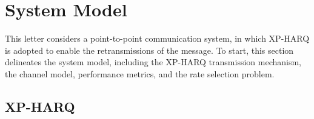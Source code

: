 \documentclass[lettersize,journal]{IEEEtran}
\begin{document}
\section{System Model}\label{sec:sys mod}
This letter considers a point-to-point communication system, in which XP-HARQ is adopted to enable the retransmissions of the message. To start, this section delineates the system model, including the XP-HARQ transmission mechanism, the channel model, performance metrics, and the rate selection problem.

\subsection{XP-HARQ}
\end{document}
